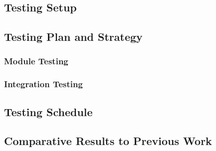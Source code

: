 \subsection{Testing Setup}

\subsection{Testing Plan and Strategy}

\subsubsection{Module Testing}

\subsubsection{Integration Testing}

\subsection{Testing Schedule}

\subsection{Comparative Results to Previous Work}

